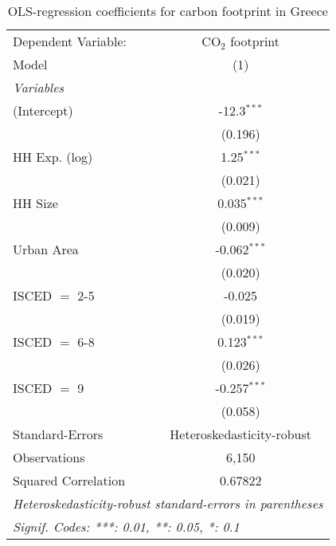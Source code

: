 
\begin{table}[htbp!]
   \centering
   \small
   \begin{adjustbox}{width = 1\textwidth, max height = 0.95\textheight, center}
      \begin{threeparttable}[b]
         \caption{\label{tab:OLS_2_GRC} OLS-regression coefficients for carbon footprint in Greece}
         \begin{tabular}{lc}
            \tabularnewline \midrule \midrule
            Dependent Variable: & CO$_{2}$ footprint\\  
            Model               & (1)\\  
            \midrule
            \emph{Variables}\\
            (Intercept)         & -12.3$^{***}$\\   
                                & (0.196)\\   
            HH Exp. (log)       & 1.25$^{***}$\\   
                                & (0.021)\\   
            HH Size             & 0.035$^{***}$\\   
                                & (0.009)\\   
            Urban Area          & -0.062$^{***}$\\   
                                & (0.020)\\   
            ISCED $=$ 2-5       & -0.025\\   
                                & (0.019)\\   
            ISCED $=$ 6-8       & 0.123$^{***}$\\   
                                & (0.026)\\   
            ISCED $=$ 9         & -0.257$^{***}$\\   
                                & (0.058)\\   
            \midrule 
            Standard-Errors     & Heteroskedasticity-robust \\   
            Observations        & 6,150\\  
            Squared Correlation & 0.67822\\  
            \midrule \midrule
            \multicolumn{2}{l}{\emph{Heteroskedasticity-robust standard-errors in parentheses}}\\
            \multicolumn{2}{l}{\emph{Signif. Codes: ***: 0.01, **: 0.05, *: 0.1}}\\
         \end{tabular}
         

\end{threeparttable}
\end{adjustbox}
\end{table}
